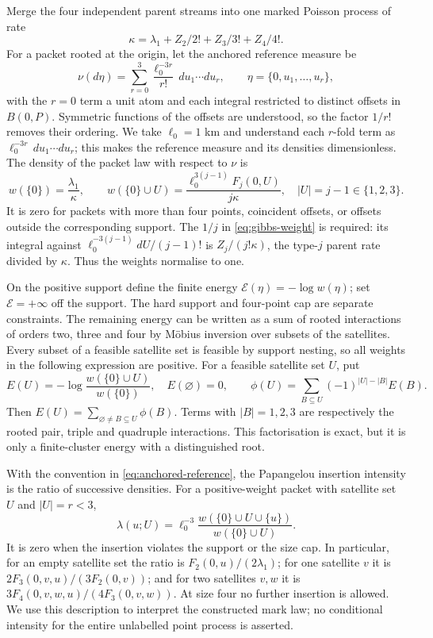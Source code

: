 Merge the four independent parent streams into one marked Poisson process of rate
\[
 \kappa=\lambda_1+Z_2/2!+Z_3/3!+Z_4/4!.
\]
For a packet rooted at the origin, let the anchored reference measure be
\begin{equation}
\nu(d\eta)=\sum_{r=0}^3\frac{\ell_0^{-3r}}{r!}\,du_1\cdots du_r,
 \qquad \eta=\{0,u_1,\ldots,u_r\},
 \label{eq:anchored-reference}
\end{equation}
with the $r=0$ term a unit atom and each integral restricted to distinct offsets in $B(0,P)$. Symmetric functions of the offsets are understood, so the factor $1/r!$ removes their ordering. We take $\ell_0=1$ km and understand each $r$-fold term as $\ell_0^{-3r}\,du_1\cdots du_r$; this makes the reference measure and its densities dimensionless. The density of the packet law with respect to $\nu$ is
\begin{equation}
 w(\{0\})=\frac{\lambda_1}{\kappa},\qquad
 w(\{0\}\cup U)=\frac{\ell_0^{3(j-1)}F_j(0,U)}{j\kappa},\quad |U|=j-1\in\{1,2,3\}.
 \label{eq:gibbs-weight}
\end{equation}
It is zero for packets with more than four points, coincident offsets, or offsets outside the corresponding support. The $1/j$ in \eqref{eq:gibbs-weight} is required: its integral against $\ell_0^{-3(j-1)}dU/(j-1)!$ is $Z_j/(j!\kappa)$, the type-$j$ parent rate divided by $\kappa$. Thus the weights normalise to one.

On the positive support define the finite energy $\mathcal E(\eta)=-\log w(\eta)$; set $\mathcal E=+\infty$ off the support. The hard support and four-point cap are separate constraints. The remaining energy can be written as a sum of rooted interactions of orders two, three and four by Möbius inversion over subsets of the satellites. Every subset of a feasible satellite set is feasible by support nesting, so all weights in the following expression are positive. For a feasible satellite set $U$, put
\[
 E(U)=-\log\frac{w(\{0\}\cup U)}{w(\{0\})},\quad E(\varnothing)=0,
 \qquad \phi(U)=\sum_{B\subseteq U}(-1)^{|U|-|B|}E(B).
\]
Then $E(U)=\sum_{\varnothing\ne B\subseteq U}\phi(B)$. Terms with $|B|=1,2,3$ are respectively the rooted pair, triple and quadruple interactions. This factorisation is exact, but it is only a finite-cluster energy with a distinguished root.

With the convention in \eqref{eq:anchored-reference}, the Papangelou insertion intensity is the ratio of successive densities. For a positive-weight packet with satellite set $U$ and $|U|=r<3$,
\[
\lambda(u;U)=\ell_0^{-3}\frac{w(\{0\}\cup U\cup\{u\})}{w(\{0\}\cup U)}.
\]
It is zero when the insertion violates the support or the size cap. In particular, for an empty satellite set the ratio is $F_2(0,u)/(2\lambda_1)$; for one satellite $v$ it is $2F_3(0,v,u)/(3F_2(0,v))$; and for two satellites $v,w$ it is $3F_4(0,v,w,u)/(4F_3(0,v,w))$. At size four no further insertion is allowed. We use this description to interpret the constructed mark law; no conditional intensity for the entire unlabelled point process is asserted.
